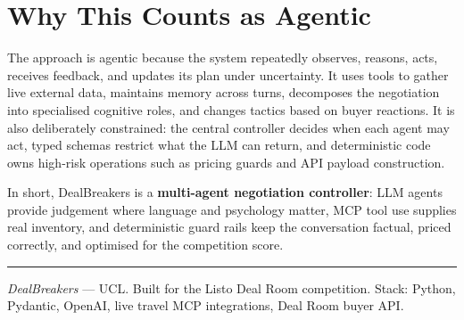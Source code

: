 \documentclass[10pt,a4paper]{article}
\begin{document}
\section*{Why This Counts as Agentic}
The approach is agentic because the system repeatedly observes, reasons, acts, receives feedback, and updates its plan under uncertainty. It uses tools to gather live external data, maintains memory across turns, decomposes the negotiation into specialised cognitive roles, and changes tactics based on buyer reactions. It is also deliberately constrained: the central controller decides when each agent may act, typed schemas restrict what the LLM can return, and deterministic code owns high-risk operations such as pricing guards and API payload construction.

In short, DealBreakers is a \textbf{multi-agent negotiation controller}: LLM agents provide judgement where language and psychology matter, MCP tool use supplies real inventory, and deterministic guard rails keep the conversation factual, priced correctly, and optimised for the competition score.

\vspace{4pt}
\hrule
\vspace{2pt}
{\footnotesize \textit{DealBreakers} --- UCL. Built for the Listo Deal Room competition. Stack: Python, Pydantic, OpenAI, live travel MCP integrations, Deal Room buyer API.}
\end{document}

